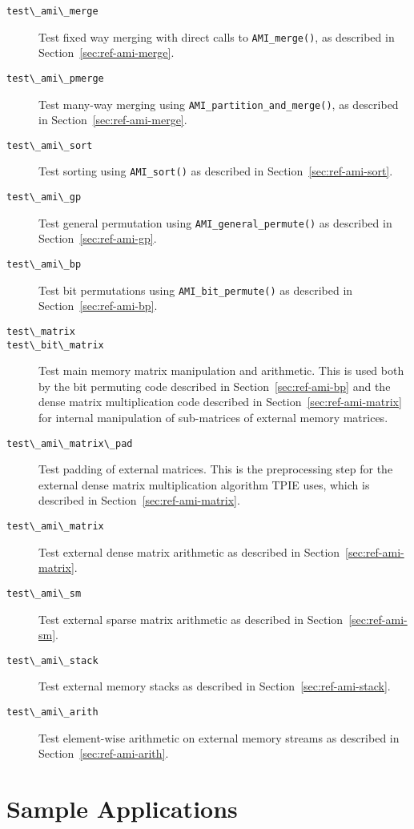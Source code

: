 \begin{description}
\item[\verb|test\_ami\_merge|] Test fixed way merging with direct
  calls to \verb|AMI_merge()|, as described in 
  Section~\ref{sec:ref-ami-merge}.
\item[\verb|test\_ami\_pmerge|] Test many-way merging using 
  \verb|AMI_partition_and_merge()|, as described in 
  Section~\ref{sec:ref-ami-merge}.
\item[\verb|test\_ami\_sort|] Test sorting using \verb|AMI_sort()| as
  described in Section~\ref{sec:ref-ami-sort}.
\item[\verb|test\_ami\_gp|] Test general permutation using
  \verb|AMI_general_permute()| as described in Section~\ref{sec:ref-ami-gp}.
\item[\verb|test\_ami\_bp|] Test bit permutations using
  \verb|AMI_bit_permute()| as described in
  Section~\ref{sec:ref-ami-bp}.
\item[\verb|test\_matrix|]
\item[\verb|test\_bit\_matrix|] Test main memory matrix manipulation
  and arithmetic.  This is used both by the bit permuting code
  described in Section~\ref{sec:ref-ami-bp} and the dense matrix
  multiplication code described in Section~\ref{sec:ref-ami-matrix}
  for internal manipulation of sub-matrices of external memory
  matrices.
\item[\verb|test\_ami\_matrix\_pad|] Test padding of external
  matrices.  This is the preprocessing step for the external dense
  matrix multiplication algorithm TPIE uses, which is described in 
  Section~\ref{sec:ref-ami-matrix}. 
\item[\verb|test\_ami\_matrix|] Test external dense matrix arithmetic
  as described in Section~\ref{sec:ref-ami-matrix}.
\item[\verb|test\_ami\_sm|] Test external sparse matrix arithmetic
  as described in Section~\ref{sec:ref-ami-sm}.
\item[\verb|test\_ami\_stack|] Test external memory stacks as
  described in Section~\ref{sec:ref-ami-stack}.
\item[\verb|test\_ami\_arith|] Test element-wise arithmetic on
  external memory streams as described in Section~\ref{sec:ref-ami-arith}.
\end{description}

\section{Sample Applications}

